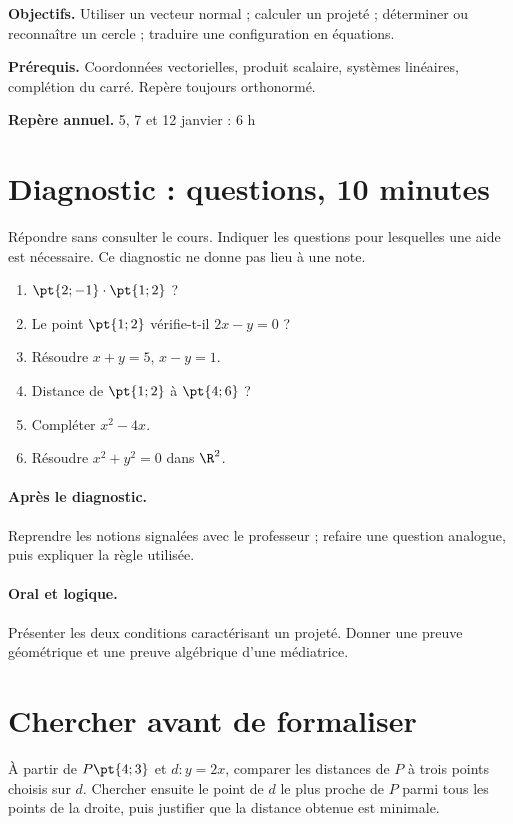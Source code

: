 \label{C07}
\begin{keypoint}
\textbf{Objectifs.} Utiliser un vecteur normal ; calculer un projeté ; déterminer ou reconnaître un cercle ; traduire une configuration en équations.

\textbf{Prérequis.} Coordonnées vectorielles, produit scalaire, systèmes linéaires, complétion du carré. Repère toujours orthonormé.

\textbf{Repère annuel.} 5, 7 et 12 janvier : 6 h\end{keypoint}
\section*{Diagnostic :  questions, 10 minutes}\label{C07-D}
Répondre sans consulter le cours. Indiquer les questions pour lesquelles une aide est nécessaire. Ce diagnostic ne donne pas lieu à une note.
\begin{enumerate}
\item $\pt{2;-1}\cdot\pt{1;2}$ ?
\item Le point $\pt{1;2}$ vérifie-t-il $2x-y=0$ ?
\item Résoudre $x+y=5$, $x-y=1$.
\item Distance de $\pt{1;2}$ à $\pt{4;6}$ ?
\item Compléter $x^2-4x$.
\item Résoudre $x^2+y^2=0$ dans $\R^2$.
\end{enumerate}
\paragraph{Après le diagnostic.} Reprendre les notions signalées avec le professeur ; refaire une question analogue, puis expliquer la règle utilisée.
\paragraph{Oral et logique.} Présenter les deux conditions caractérisant un projeté. Donner une preuve géométrique et une preuve algébrique d’une médiatrice.
\mxnewpage
\section*{Chercher avant de formaliser}\label{C07-RECH}
À partir de $P\pt{4;3}$ et $d:y=2x$, comparer les distances de $P$ à trois points choisis sur $d$. Chercher ensuite le point de $d$ le plus proche de $P$ parmi tous les points de la droite, puis justifier que la distance obtenue est minimale.
